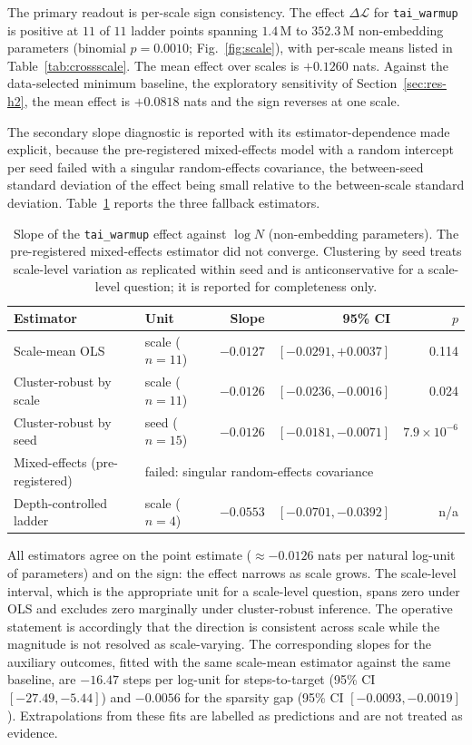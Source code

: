 \documentclass[final,5p,times,twocolumn]{elsarticle}
\theoremstyle{remark}
\newcommand{\dL}{\Delta\mathcal{L}}
\begin{document}
The primary readout is per-scale sign consistency. The effect
$\dL$ for \texttt{tai\_warmup} is positive at $11$ of $11$ ladder points
spanning $1.4$\,M to $352.3$\,M non-embedding parameters (binomial
$p = 0.0010$; Fig.~\ref{fig:scale}), with per-scale means listed in Table~\ref{tab:crossscale}. The
mean effect over scales is $+0.1260$ nats. Against the data-selected minimum
baseline, the exploratory sensitivity of Section~\ref{sec:res-h2}, the mean
effect is $+0.0818$ nats and the sign reverses at one scale.

The secondary slope diagnostic is reported with its estimator-dependence made
explicit, because the pre-registered mixed-effects model with a random
intercept per seed failed with a singular random-effects covariance, the
between-seed standard deviation of the effect being small relative to the
between-scale standard deviation. Table~\ref{tab:h6slope} reports the three
fallback estimators.

\begin{table}[t]
\centering
\footnotesize
\caption{Slope of the \texttt{tai\_warmup} effect against $\log N$
(non-embedding parameters). The pre-registered mixed-effects estimator did not
converge. Clustering by seed treats scale-level variation as replicated within
seed and is anticonservative for a scale-level question; it is reported for
completeness only.}
\label{tab:h6slope}
\begin{tabular}{@{}llrrr@{}}
\toprule
Estimator & Unit & Slope & 95\% CI & $p$ \\
\midrule
Scale-mean OLS & scale ($n=11$) & $-0.0127$ & $[-0.0291,+0.0037]$ & 0.114 \\
Cluster-robust by scale & scale ($n=11$) & $-0.0126$ & $[-0.0236,-0.0016]$ & 0.024 \\
Cluster-robust by seed & seed ($n=15$) & $-0.0126$ & $[-0.0181,-0.0071]$ & $7.9\times 10^{-6}$ \\
Mixed-effects (pre-registered) & \multicolumn{4}{l}{failed: singular random-effects covariance} \\
\midrule
Depth-controlled ladder & scale ($n=4$) & $-0.0553$ & $[-0.0701,-0.0392]$ & n/a \\
\bottomrule
\end{tabular}
\end{table}

All estimators agree on the point estimate ($\approx -0.0126$ nats per natural
log-unit of parameters) and on the sign: the effect narrows as scale grows. The
scale-level interval, which is the appropriate unit for a scale-level question,
spans zero under OLS and excludes zero marginally under cluster-robust
inference. The operative statement is accordingly that the direction is
consistent across scale while the magnitude is not resolved as
scale-varying. The corresponding slopes for the auxiliary outcomes, fitted with the same
scale-mean estimator against the same baseline, are $-16.47$ steps per
log-unit for steps-to-target (95\% CI $[-27.49, -5.44]$) and $-0.0056$ for the
sparsity gap (95\% CI $[-0.0093, -0.0019]$). Extrapolations from these fits are labelled as
predictions and are not treated as evidence.
\end{document}
